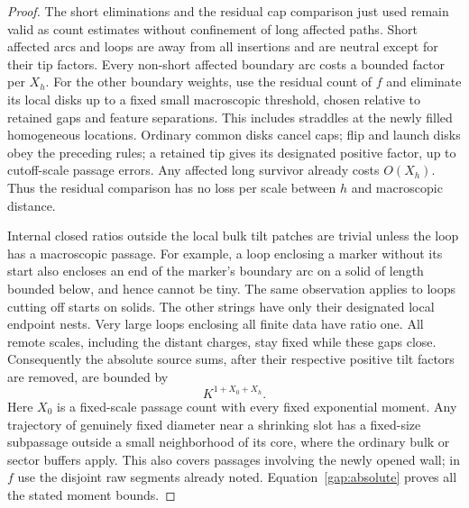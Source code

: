 \begin{proof}
The short eliminations and the residual cap comparison just used
remain valid as count estimates without confinement of long affected
paths.  Short affected arcs and loops are away from all insertions and
are neutral except for their tip factors.  Every non-short affected
boundary arc costs a bounded factor per $X_h$.  For the other boundary
weights, use the residual count of $f$ and eliminate its local disks
up to a fixed small macroscopic threshold, chosen relative to retained
gaps and feature separations.  This includes straddles at the newly
filled homogeneous locations.  Ordinary common disks cancel caps;
flip and launch disks obey the preceding rules; a retained tip gives
its designated positive factor, up to cutoff-scale passage errors.
Any affected long survivor already costs $O(X_h)$.  Thus the residual
comparison has no loss per scale between $h$ and macroscopic distance.

Internal closed ratios outside the local bulk tilt patches are trivial
unless the loop has a macroscopic passage.  For example, a loop
enclosing a marker without its start also encloses an end of the
marker's boundary arc on a solid of length bounded below, and hence
cannot be tiny.  The same observation applies to loops cutting off
starts on solids.  The other strings have only their designated local
endpoint nests.  Very large loops enclosing all finite data have ratio
one.  All remote scales, including the distant charges, stay fixed
while these gaps close.  Consequently the absolute source sums,
after their respective positive tilt factors are removed, are bounded
by
\begin{equation}
 K^{1+X_0+X_h}.
 \label{gap:absolute}
\end{equation}
Here $X_0$ is a fixed-scale passage count with every fixed exponential
moment.  Any trajectory of genuinely fixed diameter near a shrinking
slot has a fixed-size subpassage outside a small neighborhood of its
core, where the ordinary bulk or sector buffers apply.  This also
covers passages involving the newly opened wall; in $f$ use the
disjoint raw segments already noted.  Equation~\eqref{gap:absolute}
proves all the stated moment bounds.


\end{proof}
